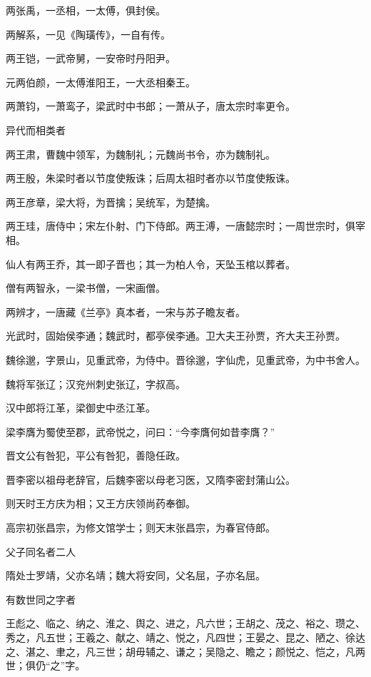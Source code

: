 \documentclass[a4paper,12pt,UTF8,twoside]{ctexbook}
\begin{document}
    两张禹，一丞相，一太傅，俱封侯。
    
    两解系，一见《陶璜传》，一自有传。
    
    两王铠，一武帝舅，一安帝时丹阳尹。
    
    元两伯颜，一太傅淮阳王，一大丞相秦王。
    
    两萧钧，一萧鸾子，梁武时中书郎；一萧从子，唐太宗时率更令。
    
    异代而相类者
    
    两王肃，曹魏中领军，为魏制礼；元魏尚书令，亦为魏制礼。
    
    两王殷，朱梁时者以节度使叛诛；后周太祖时者亦以节度使叛诛。
    
    两王彦章，梁大将，为晋擒；吴统军，为楚擒。
    
    两王珪，唐侍中；宋左仆射、门下侍郎。两王溥，一唐懿宗时；一周世宗时，俱宰相。
    
    仙人有两王乔，其一即子晋也；其一为柏人令，天坠玉棺以葬者。
    
    僧有两智永，一梁书僧，一宋画僧。
    
    两辨才，一唐藏《兰亭》真本者，一宋与苏子瞻友者。
    
    光武时，固始侯李通；魏武时，都亭侯李通。卫大夫王孙贾，齐大夫王孙贾。
    
    魏徐邈，字景山，见重武帝，为侍中。晋徐邈，字仙虎，见重武帝，为中书舍人。
    
    魏将军张辽；汉兖州刺史张辽，字叔高。
    
    汉中郎将江革，梁御史中丞江革。
    
    梁李膺为蜀使至郡，武帝悦之，问曰：“今李膺何如昔李膺？”
    
    晋文公有咎犯，平公有咎犯，善隐任政。
    
    晋李密以祖母老辞官，后魏李密以母老习医，又隋李密封蒲山公。
    
    则天时王方庆为相；又王方庆领尚药奉御。
    
    高宗初张昌宗，为修文馆学士；则天末张昌宗，为春官侍郎。
    
    父子同名者二人
    
    隋处士罗靖，父亦名靖；魏大将安同，父名屈，子亦名屈。
    
    有数世同之字者
    
    王彪之、临之、纳之、淮之、舆之、进之，凡六世；王胡之、茂之、裕之、瓒之、秀之，凡五世；王羲之、献之、靖之、悦之，凡四世；王晏之、昆之、陋之、徐达之、湛之、聿之，凡三世；胡毋辅之、谦之；吴隐之、瞻之；颜悦之、恺之，凡两世；俱仍“之”字。
    
\end{document}
